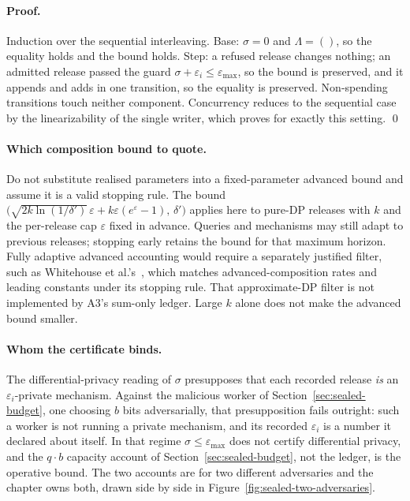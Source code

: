 \documentclass[11pt,a4paper]{article}
\theoremstyle{definition}
\begin{document}
\paragraph{Proof.}
Induction over the sequential interleaving. Base: $\sigma=0$ and
$\Lambda=()$, so the equality holds and the bound holds. Step: a refused
release changes nothing; an admitted release passed the guard
$\sigma+\varepsilon_i\le\varepsilon_{\max}$, so the bound is preserved, and it
appends and adds in one transition, so the equality is preserved. Non-spending
transitions touch neither component. Concurrency reduces to the sequential
case by the linearizability of the single writer, which
 proves for exactly this setting. \qed

\paragraph{Which composition bound to quote.}
Do not substitute realised parameters into a fixed-parameter advanced bound
and assume it is a valid stopping rule. The bound
$\bigl(\sqrt{2k\ln(1/\delta')}\,\varepsilon+k\varepsilon(e^\varepsilon-1),\,\delta'\bigr)$
 applies here to pure-DP releases with $k$ and the per-release
cap $\varepsilon$ fixed in advance. Queries and mechanisms may still adapt to
previous releases; stopping early retains the bound for that maximum horizon.
Fully adaptive advanced accounting would require a
separately justified filter, such as Whitehouse et al.'s\ ,
which matches advanced-composition rates and leading constants under its
stopping rule. That approximate-DP filter is not implemented by A3's sum-only
ledger. Large $k$ alone does not make the advanced bound smaller.

\paragraph{Whom the certificate binds.}
The differential-privacy reading of $\sigma$ presupposes that each recorded
release \emph{is} an $\varepsilon_i$-private mechanism. Against the malicious
worker of Section~\ref{sec:sealed-budget}, one choosing $b$ bits
adversarially, that presupposition fails outright: such a worker is not
running a private mechanism, and its recorded $\varepsilon_i$ is a number it
declared about itself. In that regime $\sigma\le\varepsilon_{\max}$ does not
certify differential privacy, and the $q\cdot b$ capacity account of
Section~\ref{sec:sealed-budget}, not the ledger, is the operative bound. The
two accounts are for two different adversaries and the chapter owns both,
drawn side by side in Figure~\ref{fig:sealed-two-adversaries}.
\end{document}
